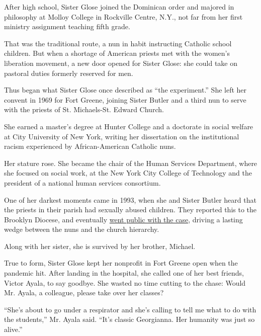 After high school, Sister Glose joined the Dominican order and majored
in philosophy at Molloy College in Rockville Centre, N.Y., not far from
her first ministry assignment teaching fifth grade.

That was the traditional route, a nun in habit instructing Catholic
school children. But when a shortage of American priests met with the
women's liberation movement, a new door opened for Sister Glose: she
could take on pastoral duties formerly reserved for men.

Thus began what Sister Glose once described as ``the experiment.'' She
left her convent in 1969 for Fort Greene, joining Sister Butler and a
third nun to serve with the priests of St. Michaels-St. Edward Church.

She earned a master's degree at Hunter College and a doctorate in social
welfare at City University of New York, writing her dissertation on the
institutional racism experienced by African-American Catholic nuns.

Her stature rose. She became the chair of the Human Services Department,
where she focused on social work, at the New York City College of
Technology and the president of a national human services consortium.

One of her darkest moments came in 1993, when she and Sister Butler
heard that the priests in their parish had sexually abused children.
They reported this to the Brooklyn Diocese, and eventually
\href{https://www.nytimes.com/2002/03/15/nyregion/bitterness-in-brooklyn-diocese-over-abuse-case.html}{went
public with the case}, driving a lasting wedge between the nuns and the
church hierarchy.

Along with her sister, she is survived by her brother, Michael.

True to form, Sister Glose kept her nonprofit in Fort Greene open when
the pandemic hit. After landing in the hospital, she called one of her
best friends, Victor Ayala, to say goodbye. She wasted no time cutting
to the chase: Would Mr. Ayala, a colleague, please take over her
classes?

``She's about to go under a respirator and she's calling to tell me what
to do with the students,'' Mr. Ayala said. ``It's classic Georgianna.
Her humanity was just so alive.''

\href{https://www.nytimes.com/interactive/2020/obituaries/people-died-coronavirus-obituaries.html?action=click\&pgtype=Article\&state=default\&region=BELOW_MAIN_CONTENT\&context=covid_obits_promo}{}

